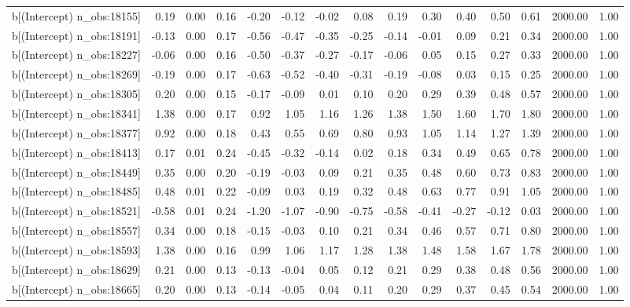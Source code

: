 \begin{table}[ht]
\begin{tabular}{rrrrrrrrrrrrrrr}
  b[(Intercept) n\_obs:18155] & 0.19 & 0.00 & 0.16 & -0.20 & -0.12 & -0.02 & 0.08 & 0.19 & 0.30 & 0.40 & 0.50 & 0.61 & 2000.00 & 1.00 \\ 
  b[(Intercept) n\_obs:18191] & -0.13 & 0.00 & 0.17 & -0.56 & -0.47 & -0.35 & -0.25 & -0.14 & -0.01 & 0.09 & 0.21 & 0.34 & 2000.00 & 1.00 \\ 
  b[(Intercept) n\_obs:18227] & -0.06 & 0.00 & 0.16 & -0.50 & -0.37 & -0.27 & -0.17 & -0.06 & 0.05 & 0.15 & 0.27 & 0.33 & 2000.00 & 1.00 \\ 
  b[(Intercept) n\_obs:18269] & -0.19 & 0.00 & 0.17 & -0.63 & -0.52 & -0.40 & -0.31 & -0.19 & -0.08 & 0.03 & 0.15 & 0.25 & 2000.00 & 1.00 \\ 
  b[(Intercept) n\_obs:18305] & 0.20 & 0.00 & 0.15 & -0.17 & -0.09 & 0.01 & 0.10 & 0.20 & 0.29 & 0.39 & 0.48 & 0.57 & 2000.00 & 1.00 \\ 
  b[(Intercept) n\_obs:18341] & 1.38 & 0.00 & 0.17 & 0.92 & 1.05 & 1.16 & 1.26 & 1.38 & 1.50 & 1.60 & 1.70 & 1.80 & 2000.00 & 1.00 \\ 
  b[(Intercept) n\_obs:18377] & 0.92 & 0.00 & 0.18 & 0.43 & 0.55 & 0.69 & 0.80 & 0.93 & 1.05 & 1.14 & 1.27 & 1.39 & 2000.00 & 1.00 \\ 
  b[(Intercept) n\_obs:18413] & 0.17 & 0.01 & 0.24 & -0.45 & -0.32 & -0.14 & 0.02 & 0.18 & 0.34 & 0.49 & 0.65 & 0.78 & 2000.00 & 1.00 \\ 
  b[(Intercept) n\_obs:18449] & 0.35 & 0.00 & 0.20 & -0.19 & -0.03 & 0.09 & 0.21 & 0.35 & 0.48 & 0.60 & 0.73 & 0.83 & 2000.00 & 1.00 \\ 
  b[(Intercept) n\_obs:18485] & 0.48 & 0.01 & 0.22 & -0.09 & 0.03 & 0.19 & 0.32 & 0.48 & 0.63 & 0.77 & 0.91 & 1.05 & 2000.00 & 1.00 \\ 
  b[(Intercept) n\_obs:18521] & -0.58 & 0.01 & 0.24 & -1.20 & -1.07 & -0.90 & -0.75 & -0.58 & -0.41 & -0.27 & -0.12 & 0.03 & 2000.00 & 1.00 \\ 
  b[(Intercept) n\_obs:18557] & 0.34 & 0.00 & 0.18 & -0.15 & -0.03 & 0.10 & 0.21 & 0.34 & 0.46 & 0.57 & 0.71 & 0.80 & 2000.00 & 1.00 \\ 
  b[(Intercept) n\_obs:18593] & 1.38 & 0.00 & 0.16 & 0.99 & 1.06 & 1.17 & 1.28 & 1.38 & 1.48 & 1.58 & 1.67 & 1.78 & 2000.00 & 1.00 \\ 
  b[(Intercept) n\_obs:18629] & 0.21 & 0.00 & 0.13 & -0.13 & -0.04 & 0.05 & 0.12 & 0.21 & 0.29 & 0.38 & 0.48 & 0.56 & 2000.00 & 1.00 \\ 
  b[(Intercept) n\_obs:18665] & 0.20 & 0.00 & 0.13 & -0.14 & -0.05 & 0.04 & 0.11 & 0.20 & 0.29 & 0.37 & 0.45 & 0.54 & 2000.00 & 1.00 \\ 

\end{tabular}
\end{table}
